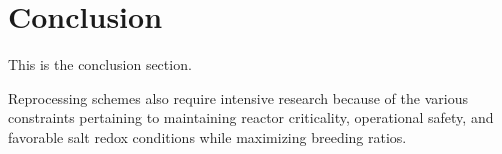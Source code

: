 \section{Conclusion}
This is the conclusion section.

Reprocessing schemes also require intensive research because
of the various constraints pertaining to maintaining reactor criticality,
operational safety, and favorable salt redox conditions while maximizing
breeding ratios.
